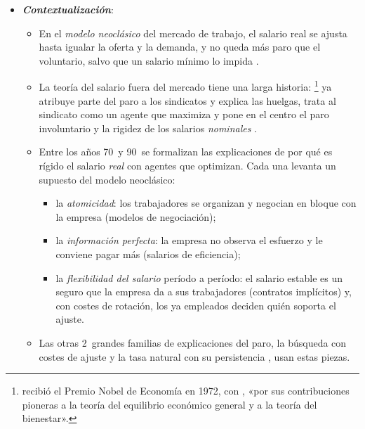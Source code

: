 \documentclass[11pt]{article}
\begin{document}
\begin{itemize}
\item \textbf{\emph{Contextualización}}:
  \begin{itemize}
  \item En el \emph{modelo neoclásico} del mercado de trabajo, el salario real se ajusta hasta igualar la oferta y la demanda, y no queda más paro que el voluntario, salvo que un salario mínimo lo impida .
  \item La teoría del salario fuera del mercado tiene una larga historia: \textcite{Hicks1932Theory}\footnote{ recibió el Premio Nobel de Economía en 1972, con , «por sus contribuciones pioneras a la teoría del equilibrio económico general y a la teoría del bienestar»\nocite{Nobel1972HicksArrow}.} ya atribuye parte del paro a los sindicatos y explica las huelgas, \textcite{Dunlop1944Wage} trata al sindicato como un agente que maximiza y \textcite{Keynes1936} pone en el centro el paro involuntario y la rigidez de los salarios \emph{nominales} .
  \item Entre los años 70~y 90~se formalizan las explicaciones de por qué es rígido el salario \emph{real} con agentes que optimizan. Cada una levanta un supuesto del modelo neoclásico:
    \begin{itemize}
    \item la \emph{atomicidad}: los trabajadores se organizan y negocian en bloque con la empresa (modelos de negociación);
    \item la \emph{información perfecta}: la empresa no observa el esfuerzo y le conviene pagar más (salarios de eficiencia);
    \item la \emph{flexibilidad del salario} período a período: el salario estable es un seguro que la empresa da a sus trabajadores (contratos implícitos) y, con costes de rotación, los ya empleados deciden quién soporta el ajuste.
    \end{itemize}
  \item Las otras 2~grandes familias de explicaciones del paro, la búsqueda con costes de ajuste  y la tasa natural con su persistencia , usan estas piezas.
  \end{itemize}


\end{itemize}
\end{document}
